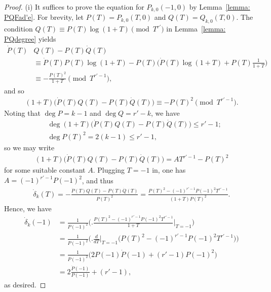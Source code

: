 \documentclass[11pt]{amsart}
\theoremstyle{definition}
\numberwithin{equation}{subsection}
\theoremstyle{plain}
\theoremstyle{plain}
\theoremstyle{plain}
\theoremstyle{plain}
\theoremstyle{plain}
\theoremstyle{plain}
\theoremstyle{plain}
\theoremstyle{plain}
\theoremstyle{plain}
\theoremstyle{plain}
\theoremstyle{plain}
\theoremstyle{plain}
\theoremstyle{definition}
\theoremstyle{definition}
\theoremstyle{definition}
\theoremstyle{remark}
\renewcommand{\(}{\textup{(}}
\renewcommand{\)}{\textup{)}}
\begin{document}
\begin{proof}
(i) It suffices to prove the equation for $P_{k,0}(-1,0)$ by Lemma~\ref{lemma: PQFad'e}. For brevity, let $P(T)=P_{k,0}(T,0)$ and $Q(T)=Q_{k,0}(T,0)$. The condition
$Q(T)\equiv P(T)\log(1+T) \pmod{T^{r'}}$ in Lemma~\ref{lemma: PQdegree} yields
    \begin{align*}
    \dot{P}(T)&Q(T)-P(T)\dot{Q}(T)
        \\
        &\equiv
        \dot{P}(T)P(T)\log(1+T)
        -P(T)\bigg(\dot{P}(T)\log(1+T)+P(T)\frac{1}{1+T}\bigg)
        \\
        &\equiv
        -\frac{P(T)^2}{1+T}
        \pmod{T^{r'-1}},
    \end{align*}
    and so
    \begin{align*}
        (1+T)\big(\dot{P}(T)Q(T)-P(T)\dot{Q}(T)\big)
        \equiv
        -P(T)^2
        \pmod{T^{r'-1}}.
    \end{align*}
Noting that $\deg P=k-1$ and $\deg Q=r'-k$, we have
    \begin{align*}
       & \deg (1+T)\big(\dot{P}(T)Q(T)-P(T)\dot{Q}(T)\big)\leq r'-1;\\
       & \deg P(T)^2=2(k-1)\leq r'-1,
    \end{align*}
so we may write
    \begin{align*}
        (1+T)\big(\dot{P}(T)Q(T)-P(T)\dot{Q}(T)\big)
        =
        AT^{r'-1}-P(T)^2
    \end{align*}
    for some suitable constant $A$. Plugging $T=-1$ in, one has $A=(-1)^{r'-1}P(-1)^2$, and thus
    \begin{align*}
    \dot{\delta}_k(T)
        =
        -\frac{\dot{P}(T)Q(T)-P(T)\dot{Q}(T)}{P(T)^2}
        =
        \frac{P(T)^2-(-1)^{r'-1}P(-1)^2T^{r'-1}}{(1+T)P(T)^2}.
    \end{align*}
Hence, we have
    \begin{align*}
    \dot{\delta}_k(-1)
        &=
        \frac{1}{P(-1)^2}\bigg(
        \bigg.
        \frac{P(T)^2-(-1)^{r'-1}P(-1)^2T^{r'-1}}{1+T}
        \bigg|_{T=-1}
        \bigg)
        \\
        &=
        \frac{1}{P(-1)^2}\bigg(
        \bigg.\frac{d}{dT}\bigg|_{T=-1}
        \big(P(T)^2-(-1)^{r'-1}P(-1)^2T^{r'-1}\big)
        \bigg)
        \\
        &=
        \frac{1}{P(-1)^2}\big(
        2P(-1)\dot{P}(-1)+(r'-1)P(-1)^2
        \big)
        \\
        &=
        2\frac{\dot{P}(-1)}{P(-1)}+(r'-1),
    \end{align*}
    as desired.


\end{proof}
\end{document}
